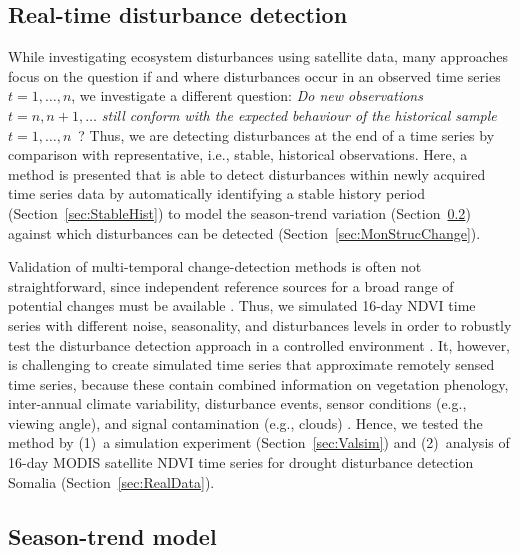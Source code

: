 \documentclass[authoryear,preprint,review,10pt]{elsarticle}
\begin{document}
\subsection{Real-time disturbance detection}\label{sec:Method}

While investigating ecosystem disturbances using satellite data, many approaches \citep[e.g.][]{Verbesselt:2010wo, White2009} focus on the question if and where disturbances occur in an observed time series $t = 1, \dots, n$, we investigate a different question: \emph{Do new observations $t = n, n + 1, \dots$ still conform with the expected behaviour of the historical sample $t = 1, \dots, n$}~? Thus, we are detecting disturbances at the end of a time series by comparison with representative, i.e., stable, historical observations. Here, a method is presented that is able to detect disturbances within newly acquired time series data by automatically identifying a stable history period (Section~\ref{sec:StableHist}) to model the season-trend variation (Section~\ref{sec:seasontrendmodel}) against which disturbances can be detected (Section~\ref{sec:MonStrucChange}).

Validation of multi-temporal change-detection methods is often not straightforward, since independent reference sources for a broad range of potential changes must be available \citep{Kennedy2007}. Thus, we simulated 16-day NDVI time series with different noise, seasonality, and disturbances levels in order to robustly test the disturbance detection approach in a controlled environment \citep{Verbesselt2009a, Verbesselt:2010wo}. It, however, is challenging to create simulated time series that approximate remotely sensed time series, because these contain combined information on vegetation phenology, inter-annual climate variability, disturbance events, sensor conditions (e.g., viewing angle), and signal contamination (e.g., clouds) \citep{Zhang2009}. Hence, we tested the method by (1)~a simulation experiment (Section~\ref{sec:Valsim}) and (2)~analysis of 16-day MODIS satellite NDVI time series for drought disturbance detection Somalia (Section~\ref{sec:RealData}). 

\subsection{Season-trend model}\label{sec:seasontrendmodel}
\end{document}
